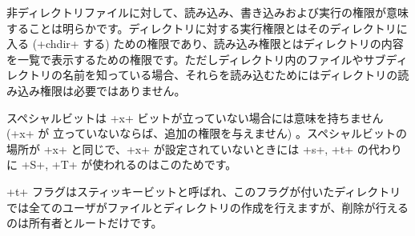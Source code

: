 非ディレクトリファイルに対して、読み込み、書き込みおよび実行の権限が意味することは明らかです。ディレクトリに対する実行権限とはそのディレクトリに入る (\ml+chdir+ する) ための権限であり、読み込み権限とはディレクトリの内容を一覧で表示するための権限です。ただしディレクトリ内のファイルやサブディレクトリの名前を知っている場合、それらを読み込むためにはディレクトリの読み込み権限は必要ではありません。

スペシャルビットは \ml+x+ ビットが立っていない場合には意味を持ちません (\ml+x+ が 立っていないならば、追加の権限を与えません) 。スペシャルビットの場所が \ml+x+ と同じで、\ml+x+ が設定されていないときには \ml+s+, \ml+t+ の代わりに \ml+S+, \ml+T+ が使われるのはこのためです。

\ml+t+ フラグはスティッキービットと呼ばれ、このフラグが付いたディレクトリでは全てのユーザがファイルとディレクトリの作成を行えますが、削除が行えるのは所有者とルートだけです。

